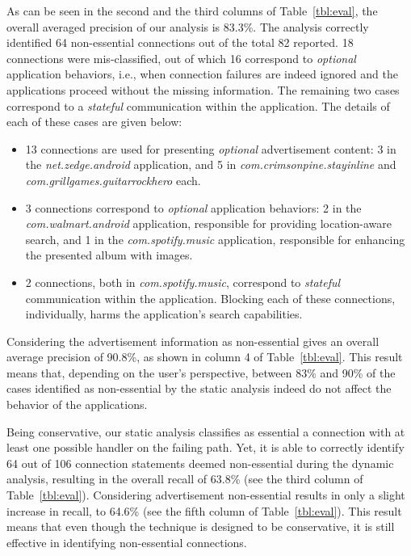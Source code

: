 As can be seen in the second and the third columns of Table~\ref{tbl:eval}, the overall averaged precision of our analysis is 83.3\%. 
The analysis correctly identified 64 non-essential connections out of the total 82 reported. 
18 connections were mis-classified, out of which 16 correspond to \emph{optional} application behaviors, i.e.,
when connection failures are indeed ignored and the applications proceed without the missing information. The 
remaining two cases correspond to a \emph{stateful} communication within the application. 
The details of each of these cases are given below: 

\begin{itemize}\setlength{\itemsep}{-0.05in}
\item 13 connections are used for presenting \emph{optional} advertisement content: 
3 in the \emph{net.zedge.android} application, and 
5 in \emph{com.crimsonpine.stayinline} and \emph{com.grillgames.guitarrockhero} each.
\item 3 connections correspond to 
\emph{optional} application behaviors: 2 in the \emph{com.walmart.android} application, responsible for providing location-aware search, and 1 in the \emph{com.spotify.music} application, responsible for enhancing the presented album with images.
\item 2 connections, both in \emph{com.spotify.music}, correspond to \emph{stateful} communication within the application. 
Blocking each of these connections, individually, harms the application's search capabilities.
\end{itemize}

Considering the advertisement information as non-essential gives an overall average precision of 90.8\%, as shown in column 4 of Table~\ref{tbl:eval}. 
This result means that, depending on the user's perspective, 
between 83\% and 90\% of the cases identified as non-essential by the static analysis indeed do not affect the behavior of the applications. 

Being conservative, our static analysis classifies as essential a connection with at least one possible handler on the failing path. Yet, it is able to correctly identify 64 out of 106 connection statements deemed non-essential during the dynamic analysis, resulting in the overall recall of 63.8\% (see the third column of Table~\ref{tbl:eval}). Considering advertisement non-essential results in only a slight increase in recall, to 64.6\% (see the fifth column of Table~\ref{tbl:eval}). This result means that even though the technique is designed to be conservative, it is still effective in identifying non-essential connections.


